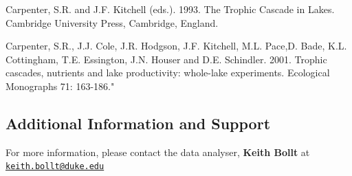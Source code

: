 \documentclass[12pt,]{article}
\begin{document}
Carpenter, S.R. and J.F. Kitchell (eds.). 1993. The Trophic Cascade in
Lakes. Cambridge University Press, Cambridge, England.

Carpenter, S.R., J.J. Cole, J.R. Hodgson, J.F. Kitchell, M.L. Pace,D.
Bade, K.L. Cottingham, T.E. Essington, J.N. Houser and D.E. Schindler.
2001. Trophic cascades, nutrients and lake productivity: whole-lake
experiments. Ecological Monographs 71: 163-186."

\subsection{Additional Information and
Support}\label{additional-information-and-support}

For more information, please contact the data analyser, \textbf{Keith
Bollt} at
\href{mailto:keith.bollt@duke.edu}{\nolinkurl{keith.bollt@duke.edu}}
\end{document}
